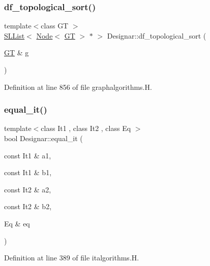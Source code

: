 \subsubsection{\texorpdfstring{df\+\_\+topological\+\_\+sort()}{df\_topological\_sort()}}
{\footnotesize\ttfamily template$<$class GT $>$ \\
\hyperlink{class_designar_1_1_s_l_list}{S\+L\+List}$<$ \hyperlink{namespace_designar_a5af326c65aa2bd26b26c410f2030d09e}{Node}$<$ \hyperlink{demo-buildgraph_8_c_a3001c40d2c31ca87ed96cd7d1334a55e}{GT} $>$ $\ast$ $>$ Designar\+::df\+\_\+topological\+\_\+sort (\begin{DoxyParamCaption}\item[{\hyperlink{demo-buildgraph_8_c_a3001c40d2c31ca87ed96cd7d1334a55e}{GT} \&}]{g }\end{DoxyParamCaption})}



Definition at line 856 of file graphalgorithms.\+H.

\mbox{\label{namespace_designar_a72be3d25570a225bb5e468e62dd73984}} 
\subsubsection{\texorpdfstring{equal\+\_\+it()}{equal\_it()}\hspace{0.1cm}{\footnotesize\ttfamily [1/2]}}
{\footnotesize\ttfamily template$<$class It1 , class It2 , class Eq $>$ \\
bool Designar\+::equal\+\_\+it (\begin{DoxyParamCaption}\item[{const It1 \&}]{a1,  }\item[{const It1 \&}]{b1,  }\item[{const It2 \&}]{a2,  }\item[{const It2 \&}]{b2,  }\item[{Eq \&}]{eq }\end{DoxyParamCaption})}



Definition at line 389 of file italgorithms.\+H.

\mbox{\label{namespace_designar_a022cf72b1e28929770af36d322a89c9d}} 
